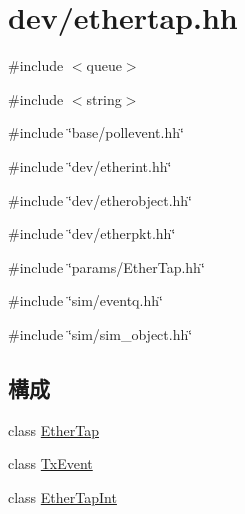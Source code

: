 \hypertarget{ethertap_8hh}{
\section{dev/ethertap.hh}
\label{ethertap_8hh}
}
{\ttfamily \#include $<$queue$>$}\par
{\ttfamily \#include $<$string$>$}\par
{\ttfamily \#include \char`\"{}base/pollevent.hh\char`\"{}}\par
{\ttfamily \#include \char`\"{}dev/etherint.hh\char`\"{}}\par
{\ttfamily \#include \char`\"{}dev/etherobject.hh\char`\"{}}\par
{\ttfamily \#include \char`\"{}dev/etherpkt.hh\char`\"{}}\par
{\ttfamily \#include \char`\"{}params/EtherTap.hh\char`\"{}}\par
{\ttfamily \#include \char`\"{}sim/eventq.hh\char`\"{}}\par
{\ttfamily \#include \char`\"{}sim/sim\_\-object.hh\char`\"{}}\par
\subsection*{構成}
\begin{DoxyCompactItemize}
\item 
class \hyperlink{classEtherTap}{EtherTap}
\item 
class \hyperlink{classEtherTap_1_1TxEvent}{TxEvent}
\item 
class \hyperlink{classEtherTapInt}{EtherTapInt}
\end{DoxyCompactItemize}
